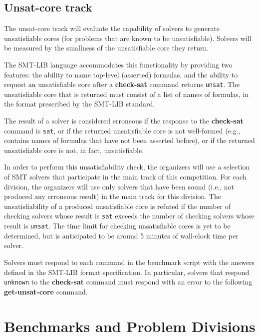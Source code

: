 \documentclass[12pt]{article}
\newcommand{\akey}[1]{\textbf{#1}}
\begin{document}
\subsection{Unsat-core track}
\label{sec:exec:unsat-core}

The unsat-core track will evaluate the capability of solvers to
generate unsatisfiable cores (for problems that are known to be
unsatisfiable).  Solvers will be measured by the smallness of the
unsatisfiable core they return.

The SMT-LIB language accommodates this functionality by providing two
features: the ability to name top-level (asserted) formulas, and the
ability to request an unsatisfiable core after a \akey{check-sat}
command returns \texttt{unsat}.  The unsatisfiable core that is
returned must consist of a list of names of formulas, in the format
prescribed by the SMT-LIB standard.

The result of a solver is considered erroneous if the response to the
\akey{check-sat} command is \texttt{sat}, or if the returned
unsatisfiable core is not well-formed (e.g., contains names of
formulas that have not been asserted before), or if the returned
unsatisfiable core is not, in fact, unsatisfiable.

In order to perform this unsatisfiability check, the organizers will
use a selection of SMT solvers that participate in the main track of
this competition.  For each division, the organizers will use only
solvers that have been sound (i.e., not produced any erroneous result)
in the main track for this division.  The unsatisfiability of a
produced unsatisfiable core is refuted if the number of checking
solvers whose result is \texttt{sat} exceeds the number of checking
solvers whose result is \texttt{unsat}.  The time limit for checking
unsatisfiable cores is yet to be determined, but is anticipated to be
around 5 minutes of wall-clock time per solver.

Solvers must respond to each command in the benchmark script with the
answers defined in the SMT-LIB format specification.  In particular,
solvers that respond \texttt{unknown} to the \akey{check-sat} command
must respond with an error to the following \akey{get-unsat-core}
command.


\section{Benchmarks and Problem Divisions}
\end{document}
